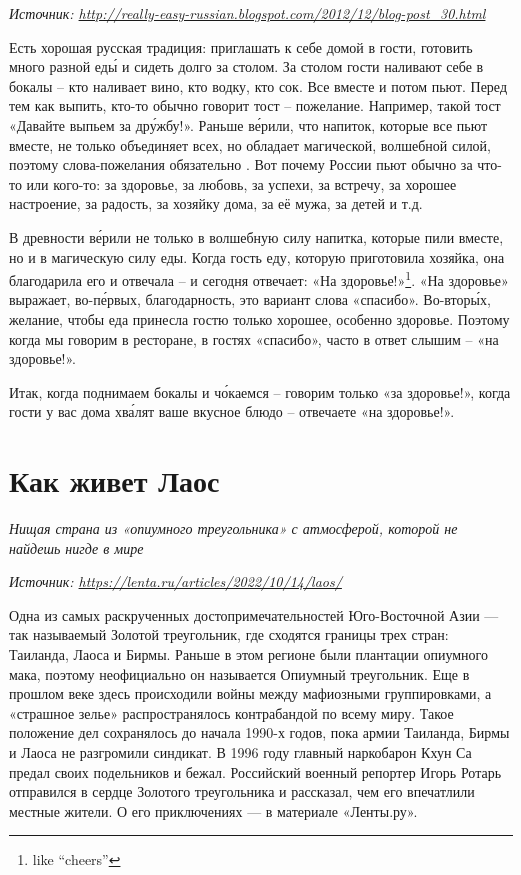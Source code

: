 \textit{Источник: \url{http://really-easy-russian.blogspot.com/2012/12/blog-post_30.html}}

Есть хорошая русская традиция: приглашать к себе домой в гости, готовить много разной ед\'{ы} и сидеть долго за столом. За столом гости наливают себе в бокалы – кто наливает вино, кто водку, кто сок. Все вместе  и потом пьют.
Перед тем как выпить, кто-то обычно говорит тост – пожелание. Например, такой тост «Давайте выпьем за др\'{у}жбу!». Раньше в\'{е}рили, что напиток, которые все пьют вместе, не только объединяет всех, но обладает магической, волшебной силой, поэтому слова-пожелания обязательно .
Вот почему России пьют обычно за что-то или кого-то: за здоровье, за любовь, за успехи, за встречу, за хорошее настроение, за радость, за хозяйку дома, за её мужа, за детей и т.д.

В древности в\'{е}рили не только в волшебную силу напитка, которые пили вместе, но и в магическую силу еды. Когда гость  еду, которую приготовила хозяйка, она благодарила его и отвечала – и сегодня отвечает: «На здоровье!»\footnote{like ``cheers''}. «На здоровье» выражает, во-п\'{е}рвых, благодарность, это вариант слова «спасибо».
Во-втор\'{ы}х, желание, чтобы еда принесла гостю только хорошее, особенно здоровье. Поэтому когда мы говорим в ресторане, в гостях «спасибо», часто в ответ слышим – «на здоровье!».

Итак, когда поднимаем бокалы и ч\'{о}каемся -- говорим только «за здоровье!», когда гости у вас дома хв\'{а}лят ваше вкусное блюдо – отвечаете «на здоровье!».

\section{Как живет Лаос}

\textit{Нищая страна из «опиумного треугольника» с атмосферой, которой не найдешь нигде в мире}

\textit{Источник: \url{https://lenta.ru/articles/2022/10/14/laos/}}

Одна из самых раскрученных достопримечательностей Юго-Восточной Азии — так называемый Золотой треугольник, где сходятся границы трех стран: Таиланда, Лаоса и Бирмы. Раньше в этом регионе были плантации опиумного мака, поэтому неофициально он называется Опиумный треугольник. Еще в прошлом веке здесь происходили войны между мафиозными группировками, а «страшное зелье» распространялось контрабандой по всему миру. Такое положение дел сохранялось до начала 1990-х годов, пока армии Таиланда, Бирмы и Лаоса не разгромили синдикат. В 1996 году главный наркобарон Кхун Са предал своих подельников и бежал. Российский военный репортер Игорь Ротарь отправился в сердце Золотого треугольника и рассказал, чем его впечатлили местные жители. О его приключениях — в материале «Ленты.ру».

